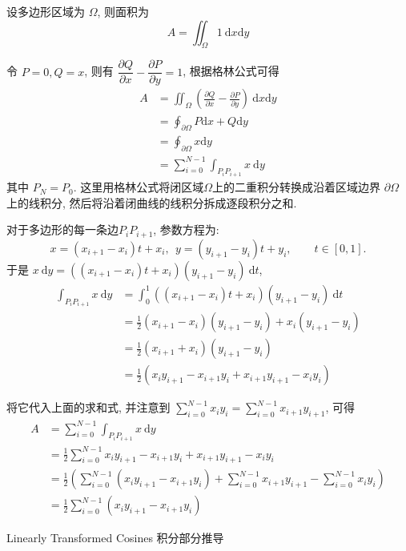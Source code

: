 设多边形区域为 $\Omega$, 则面积为
\[
A = \iint_\Omega {1}\ \mathrm{d}x\mathrm{d}y
\]

令 $P = 0, Q = x$, 则有 $\dfrac{\partial Q}{\partial x} - \dfrac{\partial P}{\partial y} = 1$, 根据格林公式可得
\begin{align*}
A &= \iint_\Omega {\left( \frac{\partial Q}{\partial x} - \frac{\partial P}{\partial y} \right)}\ \mathrm{d}x\mathrm{d}y \\
&= \oint_{\partial\Omega} P\mathrm{d}x + Q\mathrm{d}y\\
&= \oint_{\partial\Omega} x\mathrm{d}y \\
&= \sum_{i=0}^{N-1} \int_{P_iP_{i+1}} x\ \mathrm{d}y
\end{align*}
其中 $P_N = P_0$. 
这里用格林公式将闭区域$\Omega$上的二重积分转换成沿着区域边界 $\partial\Omega$ 上的线积分, 然后将沿着闭曲线的线积分拆成逐段积分之和.

对于多边形的每一条边$P_{i}P_{i+1}$, 参数方程为:
\[
x = (x_{i+1}-x_i)t + x_i, \ \ y = (y_{i+1}-y_i)t + y_i, \qquad t\in[0,1].
\]
于是 $x\ \mathrm{d}y = ((x_{i+1}-x_i)t+x_i)(y_{i+1}-y_i)\ \mathrm{d}t$, 
\begin{align*}
\int_{P_iP_{i+1}} x\ \mathrm{d}y &= \int_0^1 ((x_{i+1}-x_i)t+x_i)(y_{i+1}-y_i)\ \mathrm{d}t\\
&= \frac{1}{2}(x_{i+1}-x_i)(y_{i+1}-y_i) + x_i(y_{i+1}-y_i) \\
&= \frac{1}{2}(x_{i+1}+x_i)(y_{i+1}-y_i) \\
&= \frac{1}{2}(x_i y_{i+1}-x_{i+1} y_i + x_{i+1}y_{i+1}-x_i y_i)
\end{align*}

将它代入上面的求和式, 并注意到 $\displaystyle \sum_{i=0}^{N-1}x_iy_i = \sum_{i=0}^{N-1}x_{i+1}y_{i+1} $, 可得
\begin{align*}
A &= \sum_{i=0}^{N-1} \int_{P_iP_{i+1}} x\ \mathrm{d}y \\
&= \frac{1}{2}\sum_{i=0}^{N-1}{x_i y_{i+1}-x_{i+1} y_i + x_{i+1}y_{i+1}-x_i y_i}\\
&= \frac{1}{2}\left(\sum_{i=0}^{N-1} (x_i y_{i+1}-x_{i+1} y_i) + \sum_{i=0}^{N-1} x_{i+1}y_{i+1} - \sum_{i=0}^{N-1} x_i y_i\right)\\
&= \frac{1}{2}\sum_{i=0}^{N-1} (x_i y_{i+1}-x_{i+1} y_i)
\end{align*}


\newpage
\noindent Linearly Transformed Cosines 积分部分推导

